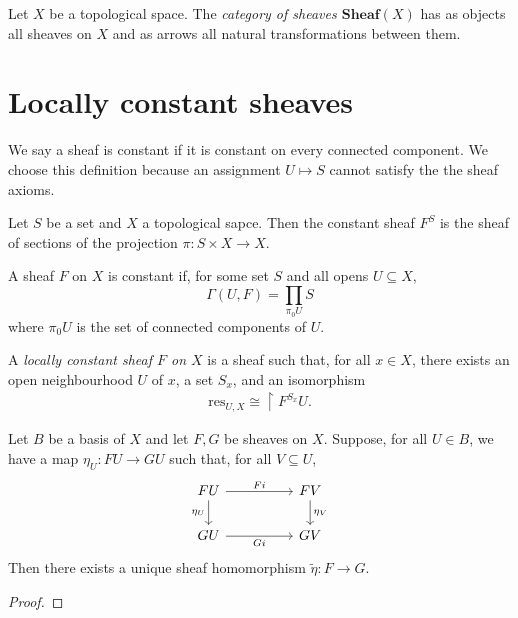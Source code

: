 \documentclass{article}
\begin{document}
\begin{definition}
  Let $X$ be a topological space. The \emph{category of sheaves $\textbf{Sheaf}(X)$}
  has as objects all sheaves on $X$ and as arrows all natural transformations between
  them.
\end{definition}

\section{Locally constant sheaves}\label{sec:locally_constant_sheaves}

We say a sheaf is constant if it is constant on every connected component. We choose this
definition because an assignment $U\mapsto S$ cannot satisfy the the sheaf axioms.

\begin{definition}
  Let $S$ be a set and $X$ a topological sapce. Then
  the constant sheaf $F^S$ is the sheaf of sections
  of the projection $\pi:S\times X\to X$.
\end{definition}


\begin{definition}
  A sheaf $F$ on $X$ is constant if, for some set $S$ and all opens $U\subseteq X$,
  \begin{equation}
    \Gamma(U,F) = \prod_{\pi_0U}S
  \end{equation}
  where $\pi_0U$ is the set of connected components of $U$.
\end{definition}

\begin{definition}
  A \emph{locally constant sheaf $F$ on $X$} is a sheaf such that,
  for all $x\in X$, there exists an open neighbourhood $U$ of $x$,
  a set $S_x$, and an isomorphism
  \begin{align*}
    \text{res}_{U,X} \cong \restriction{F^{S_x}}{U}.
  \end{align*}
\end{definition}

\begin{lemma}
  Let $B$ be a basis of $X$ and let $F,G$ be sheaves on $X$. Suppose, for all $U\in B$,
  we have a map $\eta_U:FU\to GU$ such that, for all $V\subseteq U$,
  \begin{equation}
    \begin{tikzcd}
      FU && FV \\
      GU && GV
      \arrow["Fi", from=1-1, to=1-3]
      \arrow["{\eta_U}"', from=1-1, to=2-1]
      \arrow["{\eta_V}", from=1-3, to=2-3]
      \arrow["Gi"', from=2-1, to=2-3]
    \end{tikzcd}
  \end{equation}
  Then there exists a unique sheaf homomorphism $\tilde\eta : F\to G$.
  \begin{proof}
    \missingproof
  \end{proof}
\end{lemma}
\end{document}
